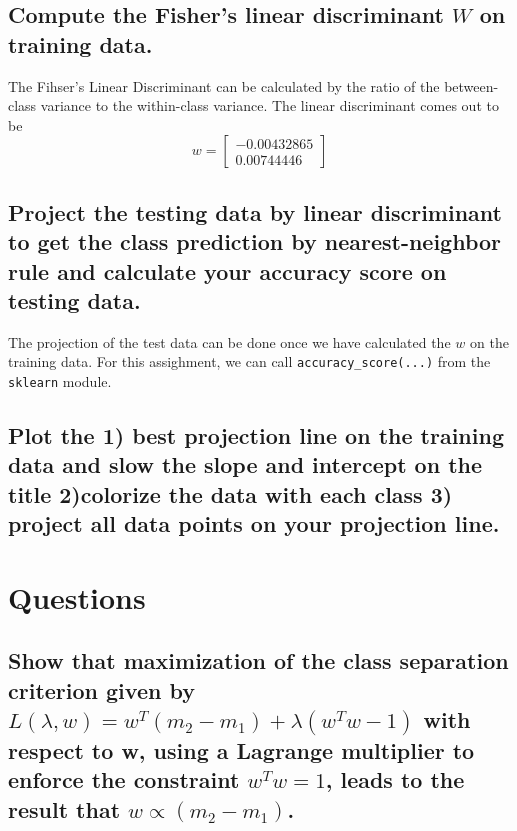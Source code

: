 \documentclass{article}
\begin{document}
	\subsection{Compute the Fisher's linear discriminant $W$ on training data.}
		The Fihser's Linear Discriminant can be calculated by the ratio of the between-class
		variance to the within-class variance. The linear discriminant comes out to be 
		\begin{equation*}
			w = 
			\begin{bmatrix}
				-0.00432865 \\
				0.00744446
			\end{bmatrix}
		\end{equation*}
	\subsection{Project the testing data by linear discriminant to get the class prediction by
		nearest-neighbor rule and calculate your accuracy score on testing data.}
		The projection of the test data can be done once we have calculated the $w$ on the training
		data. For this assighment, we can call \texttt{accuracy\_score(...)} from the \texttt{sklearn}
		module. 
	\subsection{Plot the \textbf{1) best projection line} on the training data and slow the slope
		and intercept on the title \textbf{2)colorize the data} with each class \textbf{3) project
		all data points on your projection line}.}
\section{Questions}
	\subsection{Show that maximization of the class separation criterion given by 
		$L(\lambda, w) = w^{T}(m_{2} - m_{1})  + \lambda(w^{T}w - 1)$ with respect to w, using a
		Lagrange multiplier to enforce the constraint $w^{T}w = 1$, leads to the result that 
		$w \propto (m_{2} - m_{1})$.}
\end{document}
